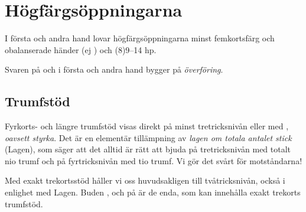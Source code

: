 \chapter{H{\"o}gf{\"a}rgs{\"o}ppningarna}

I f\"orsta och andra hand lovar h{\"o}gf{\"a}rgs{\"o}ppningarna
minst femkortsfärg och obalanserade h{\"a}nder (ej )
och (8)9--14 hp.

Svaren p{\aa}  och  i f\"orsta och andra hand
bygger p{\aa} {\em {\"o}verf{\"o}ring}.

\section{Trumfst\"od}

Fyrkorts- och längre trumfstöd visas direkt på minst tretricksnivån eller
med , {\em
oavsett styrka}. Det är en elementär tillämpning av {\em lagen om totala
antalet stick} ({\sc Lagen}), som säger att det alltid är rätt att bjuda på
tretricksnivån med totalt nio trumf och på fyrtricksnivån med tio trumf.
Vi gör det svårt för motståndarna!


Med exakt trekortsstöd håller vi oss huvudsakligen till tvåtricksnivån, också i
enlighet med {\sc Lagen}. Buden ,  och
 på  är de enda, som kan innehålla exakt trekorts trumfstöd.

